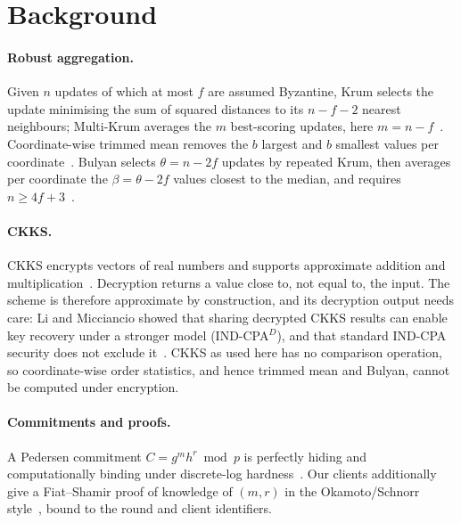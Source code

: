 \section{Background}

\paragraph{Robust aggregation.}
Given $n$ updates of which at most $f$ are assumed Byzantine, Krum selects the update minimising the sum of squared distances to its $n-f-2$ nearest neighbours; Multi-Krum averages the $m$ best-scoring updates, here $m=n-f$~\cite{blanchard2017krum}. Coordinate-wise trimmed mean removes the $b$ largest and $b$ smallest values per coordinate~\cite{yin2018trimmed}. Bulyan selects $\theta=n-2f$ updates by repeated Krum, then averages per coordinate the $\beta=\theta-2f$ values closest to the median, and requires $n\geq 4f+3$~\cite{elmhamdi2018bulyan}.

\paragraph{CKKS.}
CKKS encrypts vectors of real numbers and supports approximate addition and multiplication~\cite{cheon2017ckks}. Decryption returns a value close to, not equal to, the input. The scheme is therefore approximate by construction, and its decryption output needs care: Li and Micciancio showed that sharing decrypted CKKS results can enable key recovery under a stronger model (IND-CPA$^D$), and that standard IND-CPA security does not exclude it~\cite{li2021ckkssecurity}. CKKS as used here has no comparison operation, so coordinate-wise order statistics, and hence trimmed mean and Bulyan, cannot be computed under encryption.

\paragraph{Commitments and proofs.}
A Pedersen commitment $C=g^m h^r \bmod p$ is perfectly hiding and computationally binding under discrete-log hardness~\cite{pedersen1991commit}. Our clients additionally give a Fiat--Shamir proof of knowledge of $(m,r)$ in the Okamoto/Schnorr style~\cite{schnorr1991signature}, bound to the round and client identifiers.
